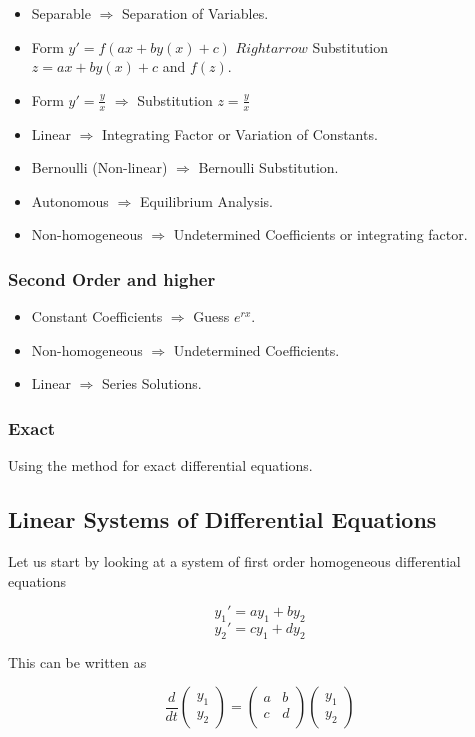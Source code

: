 \begin{itemize}[label=\(-\)]
    \item Separable \(\Rightarrow\) Separation of Variables.
    \item Form \(y' = f(ax + by(x) + c)\) \(Rightarrow\) Substitution \(z = ax + by(x) + c\) and \(f(z)\).
    \item Form \(y' = \frac{y}{x}\) \(\Rightarrow\) Substitution \(z = \frac{y}{x}\)
    \item Linear \(\Rightarrow\) Integrating Factor or Variation of Constants.
    \item Bernoulli (Non-linear) \(\Rightarrow\) Bernoulli Substitution.
    \item Autonomous \(\Rightarrow\) Equilibrium Analysis.
    \item Non-homogeneous \(\Rightarrow\) Undetermined Coefficients or integrating factor.
\end{itemize}


\subsubsection{Second Order and higher}

\begin{itemize}[label=\(-\)]
    \item Constant Coefficients \(\Rightarrow\) Guess \(e^{rx}\).
    \item Non-homogeneous \(\Rightarrow\) Undetermined Coefficients.
    \item Linear \(\Rightarrow\) Series Solutions.
\end{itemize}

\subsubsection{Exact}

Using the method for exact differential equations.

\subsection{Linear Systems of Differential Equations}

Let us start by looking at a system of first order homogeneous differential equations

\[
y_1 ' = ay_1 + by_2
\]
\[
y_2 ' = cy_1 + dy_2
\]

This can be written as 

\[
\frac{d}{dt} 
\begin{pmatrix} 
y_1 \\ 
y_2 
\end{pmatrix} 
= 
\begin{pmatrix}
a & b \\
c & d \\
\end{pmatrix} 
\begin{pmatrix}
y_1 \\ 
y_2
\end{pmatrix}
\]

